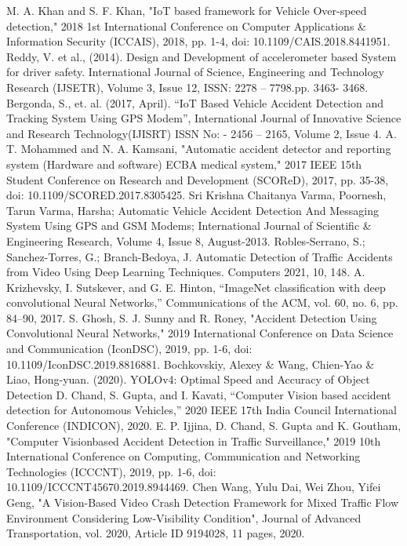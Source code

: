 \documentclass[ 12pt,a4paper,twocolumn,fleqn]{article}
\begin{document}
\begin{adjustwidth}{3.5em}{0pt}
\begin{thebibliography}{8}
M. A. Khan and S. F. Khan, "IoT based framework for Vehicle Over-speed detection," 2018 1st International Conference on Computer Applications \& Information Security (ICCAIS), 2018, pp. 1-4, doi: 10.1109/CAIS.2018.8441951.
Reddy, V. et al., (2014). Design and Development of accelerometer based System for driver safety. International Journal of Science, Engineering and Technology Research (IJSETR), Volume 3, Issue 12, ISSN: 2278 – 7798.pp. 3463- 3468.
Bergonda, S., et. al. (2017, April). “IoT Based Vehicle
Accident Detection and Tracking System Using GPS Modem”,
International Journal of Innovative Science and Research
Technology(IJISRT) ISSN No: - 2456 – 2165, Volume 2, Issue
4.
A. T. Mohammed and N. A. Kamsani, "Automatic accident detector and reporting system (Hardware and software) ECBA medical system," 2017 IEEE 15th Student Conference on Research and Development (SCOReD), 2017, pp. 35-38, doi: 10.1109/SCORED.2017.8305425.
Sri Krishna Chaitanya Varma, Poornesh, Tarun Varma, Harsha; Automatic
Vehicle Accident Detection And Messaging System Using GPS and GSM
Modems; International Journal of Scientific \& Engineering Research,
Volume 4, Issue 8, August-2013.
Robles-Serrano, S.; Sanchez-Torres, G.; Branch-Bedoya, J. Automatic Detection of Traffic Accidents from Video Using Deep Learning Techniques. Computers 2021, 10, 148.
A. Krizhevsky, I. Sutskever, and G. E. Hinton, “ImageNet classification with deep convolutional Neural Networks,” Communications of the ACM, vol. 60, no. 6, pp. 84–90, 2017.
S. Ghosh, S. J. Sunny and R. Roney, "Accident Detection Using Convolutional Neural Networks," 2019 International Conference on Data Science and Communication (IconDSC), 2019, pp. 1-6, doi: 10.1109/IconDSC.2019.8816881.
Bochkovskiy, Alexey \& Wang, Chien-Yao \& Liao, Hong-yuan. (2020). YOLOv4: Optimal Speed and Accuracy of Object Detection
D. Chand, S. Gupta, and I. Kavati, “Computer Vision based accident detection for Autonomous Vehicles,” 2020 IEEE 17th India Council International Conference (INDICON), 2020.
E. P. Ijjina, D. Chand, S. Gupta and K. Goutham, "Computer Visionbased Accident Detection in Traffic Surveillance," 2019 10th International Conference on Computing, Communication and Networking Technologies (ICCCNT), 2019, pp. 1-6, doi: 10.1109/ICCCNT45670.2019.8944469.
Chen Wang, Yulu Dai, Wei Zhou, Yifei Geng, "A Vision-Based Video Crash Detection Framework for Mixed Traffic Flow Environment Considering Low-Visibility Condition", Journal of Advanced Transportation, vol. 2020, Article ID 9194028, 11 pages, 2020.

\end{thebibliography}
\end{adjustwidth}
\end{document}
